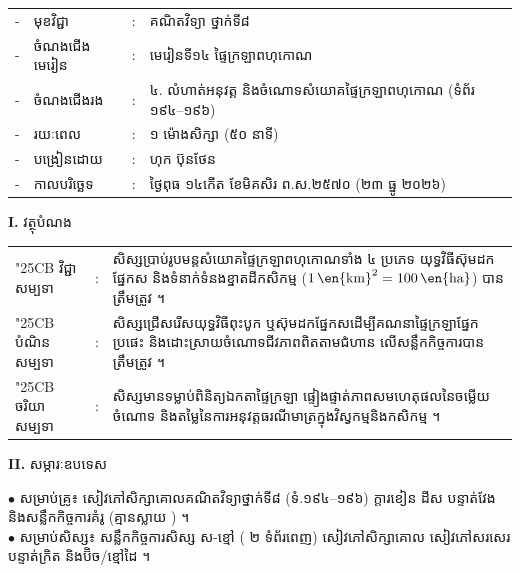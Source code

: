 \documentclass[a4paper,10pt]{article}
\newcommand{\wcirc}{{\symfont\char"25CB}}
\newcommand{\unit}[1]{\,\text{\en{#1}}}
\begin{document}
{\fontsize{10pt}{15.0pt}\selectfont
\hspace*{3.7cm}%
\begin{tabular}{@{}l l l l@{}}
  - & មុខវិជ្ជា & : & គណិតវិទ្យា ថ្នាក់ទី៨ \\
  - & ចំណងជើងមេរៀន & : & មេរៀនទី១៤ ផ្ទៃក្រឡាពហុកោណ \\
  - & ចំណងជើងរង & : & ៤. លំហាត់អនុវត្ត និងចំណោទសំយោគផ្ទៃក្រឡាពហុកោណ (ទំព័រ ១៩៤--១៩៦) \\
  - & រយៈពេល & : & ១ ម៉ោងសិក្សា (៥០ នាទី) \\
  - & បង្រៀនដោយ & : & ហុក ប៊ុនថែន \\
  - & កាលបរិច្ឆេទ & : & ថ្ងៃពុធ ១៤កើត ខែមិគសិរ ព.ស.២៥៧០ (២៣ ធ្នូ ២០២៦) \\
\end{tabular}

\vspace{1pt}

\textbf{I.} {\muol វត្ថុបំណង}\\[1pt]
\hspace*{0.55cm}%
\begin{tabular}{@{}l l L{14.2cm}@{}}
  \wcirc \hspace{0.25cm} វិជ្ជាសម្បទា & : & សិស្សប្រាប់រូបមន្តសំយោគផ្ទៃក្រឡាពហុកោណទាំង ៤ ប្រភេទ យុទ្ធវិធីស៊ុមដកផ្នែកស និងទំនាក់ទំនងខ្នាតដីកសិកម្ម ($1\unit{km}^2 = 100\unit{ha}$) បានត្រឹមត្រូវ ។ \\
  \wcirc \hspace{0.25cm} បំណិនសម្បទា & : & សិស្សជ្រើសរើសយុទ្ធវិធីពុះបូក ឬស៊ុមដកផ្នែកសដើម្បីគណនាផ្ទៃក្រឡាផ្នែកប្រផេះ និងដោះស្រាយចំណោទជីវភាពពិតតាមជំហាន  លើសន្លឹកកិច្ចការបានត្រឹមត្រូវ ។ \\
  \wcirc \hspace{0.25cm} ចរិយាសម្បទា & : & សិស្សមានទម្លាប់ពិនិត្យឯកតាផ្ទៃក្រឡា ផ្ទៀងផ្ទាត់ភាពសមហេតុផលនៃចម្លើយចំណោទ និងតម្លៃនៃការអនុវត្តធរណីមាត្រក្នុងវិស្វកម្មនិងកសិកម្ម ។ \\
\end{tabular}

\vspace{1pt}

\textbf{II.} {\muol សម្ភារៈឧបទេស}\\[1pt]
\hspace*{0.55cm}\parbox[t]{18.2cm}{$\bullet$ \hspace{0.25cm} សម្រាប់គ្រូ៖ សៀវភៅសិក្សាគោលគណិតវិទ្យាថ្នាក់ទី៨ (ទំ.១៩៤--១៩៦) ក្ដារខៀន ដីស បន្ទាត់វែង និងសន្លឹកកិច្ចការគំរូ (គ្មានស្លាយ ) ។\\
$\bullet$ \hspace{0.25cm} សម្រាប់សិស្ស៖ សន្លឹកកិច្ចការសិស្ស ស-ខ្មៅ ( ២ ទំព័រពេញ) សៀវភៅសិក្សាគោល សៀវភៅសរសេរ បន្ទាត់ក្រិត និងប៊ិច/ខ្មៅដៃ ។}

}
\end{document}
